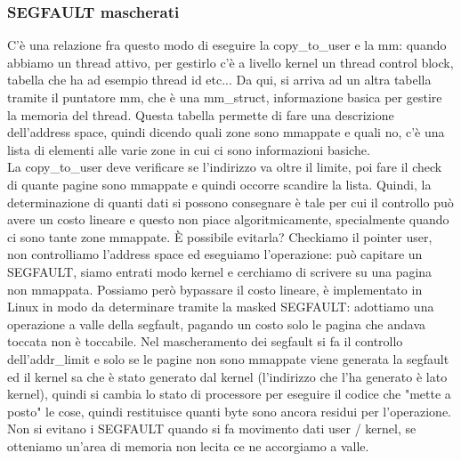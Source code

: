 \documentclass[12pt, oneside]{extbook}
\begin{document}
\subsubsection{SEGFAULT mascherati}
C'è una relazione fra questo modo di eseguire la copy\_to\_user e la mm: quando abbiamo un thread attivo, per gestirlo c'è a livello kernel un thread control block, tabella che ha ad esempio thread id etc... Da qui, si arriva ad un altra tabella tramite il puntatore mm, che è una \textsf{mm\_struct}, informazione basica per gestire la memoria del thread. Questa tabella permette di fare una descrizione dell'address space, quindi dicendo quali zone sono mmappate e quali no, c'è una lista di elementi alle varie zone in cui ci sono informazioni basiche.\\La copy\_to\_user deve verificare se l'indirizzo va oltre il limite, poi fare il check di quante pagine sono mmappate e quindi occorre scandire la lista. Quindi, la determinazione di quanti dati si possono consegnare è tale per cui il controllo può avere un costo lineare e questo non piace algoritmicamente, specialmente quando ci sono tante zone mmappate. È possibile evitarla? Checkiamo il pointer user, non controlliamo l'address space ed eseguiamo l'operazione: può capitare un SEGFAULT, siamo entrati modo kernel e cerchiamo di scrivere su una pagina non mmappata. Possiamo però bypassare il costo lineare, è implementato in Linux in modo da determinare tramite la masked SEGFAULT: adottiamo una operazione a valle della segfault, pagando un costo solo le pagina che andava toccata non è toccabile. Nel mascheramento dei segfault si fa il controllo dell'addr\_limit e solo se le pagine non sono mmappate viene generata la segfault ed il kernel sa che è stato generato dal kernel (l'indirizzo che l'ha generato è lato kernel), quindi si cambia lo stato di processore per eseguire il codice che "mette a posto" le cose, quindi restituisce quanti byte sono ancora residui per l'operazione. Non si evitano i SEGFAULT quando si fa movimento dati user / kernel, se otteniamo un'area di memoria non lecita ce ne accorgiamo a valle.
\end{document}
